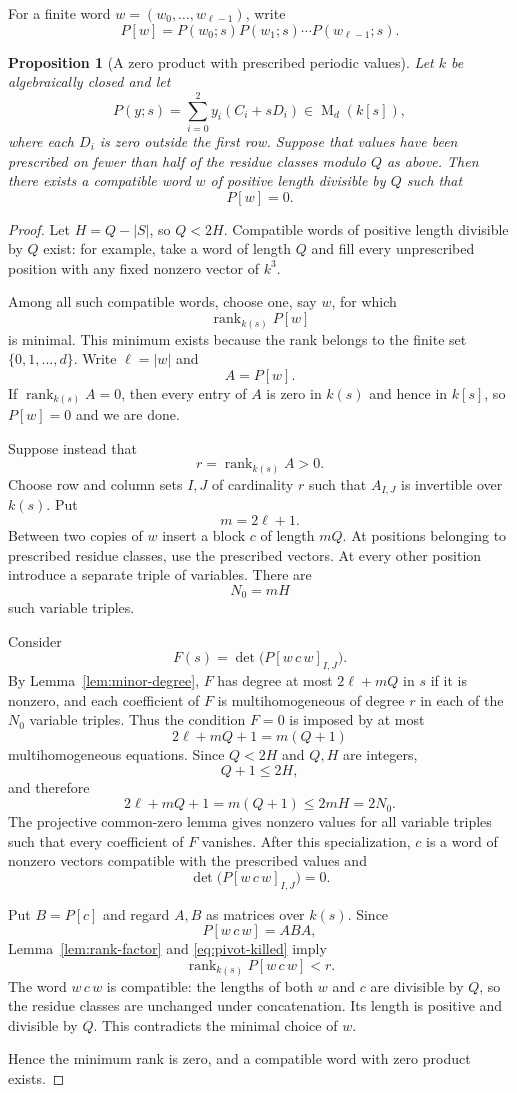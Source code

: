 \documentclass[11pt]{article}
\newtheorem{proposition}[theorem]{Proposition}
\newcommand{\rank}{\operatorname{rank}}
\newcommand{\Mat}{\operatorname{M}}
\begin{document}
For a finite word $w=(w_0,\ldots,w_{\ell-1})$, write
\[
P[w]=P(w_0;s)P(w_1;s)\cdots P(w_{\ell-1};s).
\]

\begin{proposition}[A zero product with prescribed periodic values]\label{prop:zero-word}
Let $k$ be algebraically closed and let
\[
P(y;s)=\sum_{i=0}^2y_i(C_i+sD_i)\in\Mat_d(k[s]),
\]
where each $D_i$ is zero outside the first row.  Suppose that values have been prescribed on fewer than half of the residue classes modulo $Q$ as above.  Then there exists a compatible word $w$ of positive length divisible by $Q$ such that
\[
P[w]=0.
\]
\end{proposition}

\begin{proof}
Let $H=Q-|S|$, so $Q<2H$.  Compatible words of positive length divisible by $Q$ exist: for example, take a word of length $Q$ and fill every unprescribed position with any fixed nonzero vector of $k^3$.

Among all such compatible words, choose one, say $w$, for which
\[
\rank_{k(s)}P[w]
\]
is minimal.  This minimum exists because the rank belongs to the finite set $\{0,1,\ldots,d\}$.  Write $\ell=|w|$ and
\[
A=P[w].
\]
If $\rank_{k(s)}A=0$, then every entry of $A$ is zero in $k(s)$ and hence in $k[s]$, so $P[w]=0$ and we are done.

Suppose instead that
\[
r=\rank_{k(s)}A>0.
\]
Choose row and column sets $I,J$ of cardinality $r$ such that $A_{I,J}$ is invertible over $k(s)$.  Put
\[
m=2\ell+1.
\]
Between two copies of $w$ insert a block $c$ of length $mQ$.  At positions belonging to prescribed residue classes, use the prescribed vectors.  At every other position introduce a separate triple of variables.  There are
\[
N_0=mH
\]
such variable triples.

Consider
\[
F(s)=\det\bigl(P[w\,c\,w]_{I,J}\bigr).
\]
By Lemma~\ref{lem:minor-degree}, $F$ has degree at most $2\ell+mQ$ in $s$ if it is nonzero, and each coefficient of $F$ is multihomogeneous of degree $r$ in each of the $N_0$ variable triples.  Thus the condition $F=0$ is imposed by at most
\[
2\ell+mQ+1=m(Q+1)
\]
multihomogeneous equations.  Since $Q<2H$ and $Q,H$ are integers,
\[
Q+1\le2H,
\]
and therefore
\[
2\ell+mQ+1=m(Q+1)\le2mH=2N_0.
\]
The projective common-zero lemma gives nonzero values for all variable triples such that every coefficient of $F$ vanishes.  After this specialization, $c$ is a word of nonzero vectors compatible with the prescribed values and
\begin{equation}\label{eq:pivot-killed}
\det\bigl(P[w\,c\,w]_{I,J}\bigr)=0.
\end{equation}

Put $B=P[c]$ and regard $A,B$ as matrices over $k(s)$.  Since
\[
P[w\,c\,w]=ABA,
\]
Lemma~\ref{lem:rank-factor} and \eqref{eq:pivot-killed} imply
\[
\rank_{k(s)}P[w\,c\,w]<r.
\]
The word $w\,c\,w$ is compatible: the lengths of both $w$ and $c$ are divisible by $Q$, so the residue classes are unchanged under concatenation.  Its length is positive and divisible by $Q$.  This contradicts the minimal choice of $w$.

Hence the minimum rank is zero, and a compatible word with zero product exists.
\end{proof}
\end{document}
